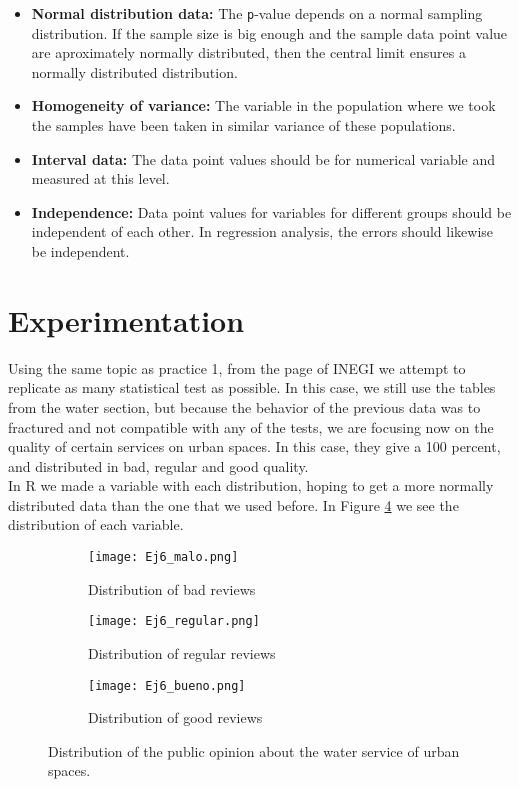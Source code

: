 \documentclass{article}
\begin{document}
\begin{itemize}\label{list2}
\item \textbf{Normal distribution data:} The \texttt{p}-value depends on a normal sampling distribution. If the sample size is big enough and the sample data point value are aproximately normally distributed, then the central limit ensures a normally distributed distribution.
\item \textbf{Homogeneity of variance:} The variable in the population where we took the samples have been taken in similar variance of these populations.
\item \textbf{Interval data:} The data point values should be for numerical variable and measured at this level.
\item \textbf{Independence:} Data point values for variables for different groups should be independent of each other. In regression analysis, the errors should likewise be independent.
\end{itemize}


\section{Experimentation}

Using the same topic as practice 1,  from the page of INEGI \cite{inegi} we attempt to replicate as many statistical test as possible. In this case, we still use the tables from the water section, but because the behavior of the previous data was to fractured and not compatible with any of the tests, we are focusing now on the quality of certain services on urban spaces. In this case, they give a 100 percent, and distributed in bad, regular and good quality. \\

In R we made a variable with each distribution, hoping to get a more normally distributed data than the one that we used before. In Figure \ref{extra} we see the distribution of each variable. \\

\begin{figure}[]
\begin{subfigure}{.3\textwidth}
  \centering
  \texttt{[image: Ej6\_malo.png]}  
  \caption{Distribution of bad reviews }
  \label{extra1}
\end{subfigure}
\begin{subfigure}{.3\textwidth}
  \centering
  \texttt{[image: Ej6\_regular.png]}  
  \caption{Distribution of regular reviews}
  \label{extra2}
\end{subfigure}
\begin{subfigure}{.3\textwidth}
  \centering
  \texttt{[image: Ej6\_bueno.png]}  
  \caption{Distribution of good reviews}
  \label{extra3}
\end{subfigure}
\caption{Distribution of the public opinion about the water service of urban spaces.}
\label{extra}
\end{figure}
\end{document}
